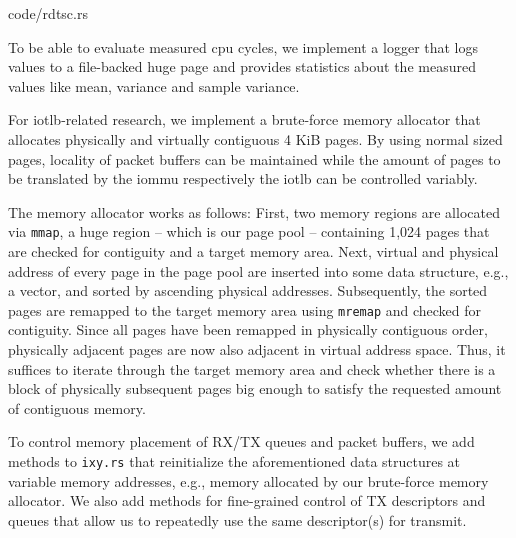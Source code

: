 \begin{minipage}{\textwidth}
    
        {code/rdtsc.rs}
\end{minipage}

To be able to evaluate measured \ac{cpu} cycles, we implement a logger that logs
values to a file-backed huge page and provides statistics about the measured
values like mean, variance and sample variance.

For \ac{iotlb}-related research, we implement a brute-force memory allocator
that allocates physically and virtually contiguous 4 KiB pages. By using normal
sized pages, locality of packet buffers can be maintained while the amount of
pages to be translated by the \ac{iommu} respectively the \ac{iotlb} can be
controlled variably.

The memory allocator works as follows: First, two memory regions are allocated
via \texttt{mmap}, a huge region -- which is our page pool -- containing 1,024
pages that are checked for contiguity and a target memory area. Next, virtual
and physical address of every page in the page pool are inserted into some data
structure, e.g., a vector, and sorted by ascending physical addresses.
Subsequently, the sorted pages are remapped to the target memory area using
\texttt{mremap} and checked for contiguity. Since all pages have been remapped
in physically contiguous order, physically adjacent pages are now also adjacent
in virtual address space. Thus, it suffices to iterate through the target memory
area and check whether there is a block of physically subsequent pages big
enough to satisfy the requested amount of contiguous memory.

To control memory placement of RX/TX queues and packet buffers, we add methods
to \texttt{ixy.rs} that reinitialize the aforementioned data structures at
variable memory addresses, e.g., memory allocated by our brute-force memory
allocator. We also add methods for fine-grained control of TX descriptors and
queues that allow us to repeatedly use the same descriptor(s) for transmit.

